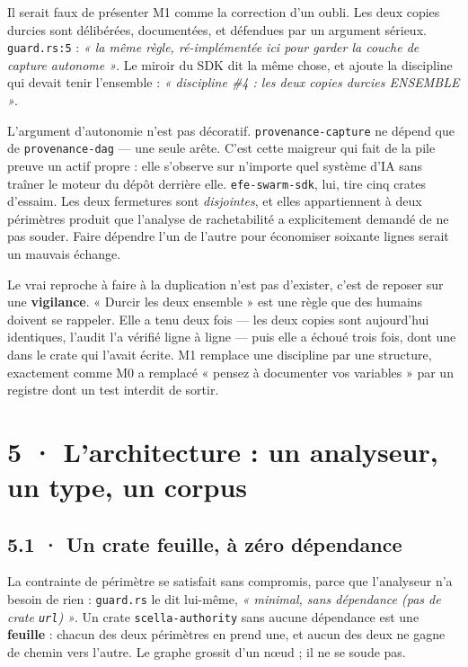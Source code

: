 \documentclass[10pt]{article}
\newcommand{\code}[1]{\texttt{\small #1}}
\begin{document}
Il serait faux de présenter M1 comme la correction d'un oubli. Les deux copies durcies sont
délibérées, documentées, et défendues par un argument sérieux. \code{guard.rs:5} :
\emph{« la même règle, ré-implémentée ici pour garder la couche de capture autonome »}. Le miroir du
SDK dit la même chose, et ajoute la discipline qui devait tenir l'ensemble : \emph{« discipline
\#4 : les deux copies durcies ENSEMBLE »}.

L'argument d'autonomie n'est pas décoratif. \code{provenance-capture} ne dépend que de
\code{provenance-dag} --- une seule arête. C'est cette maigreur qui fait de la pile preuve un actif
propre : elle s'observe sur n'importe quel système d'IA sans traîner le moteur du dépôt derrière
elle. \code{efe-swarm-sdk}, lui, tire cinq crates d'essaim. Les deux fermetures sont \emph{disjointes},
et elles appartiennent à deux périmètres produit que l'analyse de rachetabilité a explicitement
demandé de ne pas souder. Faire dépendre l'un de l'autre pour économiser soixante lignes serait un
mauvais échange.

\begin{these}
Le vrai reproche à faire à la duplication n'est pas d'exister, c'est de reposer sur une
\textbf{vigilance}. « Durcir les deux ensemble » est une règle que des humains doivent se rappeler.
Elle a tenu deux fois --- les deux copies sont aujourd'hui identiques, l'audit l'a vérifié ligne à
ligne --- puis elle a échoué trois fois, dont une dans le crate qui l'avait écrite. M1 remplace une
discipline par une structure, exactement comme M0 a remplacé « pensez à documenter vos variables »
par un registre dont un test interdit de sortir.
\end{these}

\section{5 · L'architecture : un analyseur, un type, un corpus}

\subsection{5.1 · Un crate feuille, à zéro dépendance}

La contrainte de périmètre se satisfait sans compromis, parce que l'analyseur n'a besoin de rien :
\code{guard.rs} le dit lui-même, \emph{« minimal, sans dépendance (pas de crate \code{url}) »}. Un
crate \code{scella-authority} sans aucune dépendance est une \textbf{feuille} : chacun des deux
périmètres en prend une, et aucun des deux ne gagne de chemin vers l'autre. Le graphe grossit d'un
nœud ; il ne se soude pas.
\end{document}
